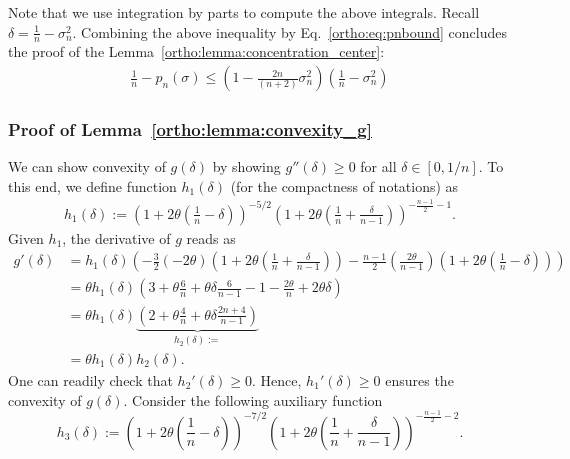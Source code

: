  Note that we use integration by parts to compute the above integrals. 
 Recall $\delta = \frac{1}{n}- \sigma_n^2$.
 Combining the above inequality by Eq.~\eqref{ortho:eq:pnbound} concludes the proof of the Lemma~\ref{ortho:lemma:concentration_center}:
 \begin{align*}
     \frac{1}{n} - p_n(\sigma) \leq \left(1-\frac{2n}{(n+2)}\sigma_n^2\right)\left(\frac{1}{n} - \sigma_n^2\right)
 \end{align*}
 \subsubsection*{Proof of Lemma~\ref{ortho:lemma:convexity_g}}
 We can show convexity of $g(\delta)$ by showing $g''(\delta)\ge 0$ for all $\delta\in [0,1/n]$. To this end, 
 we define function $h_1(\delta)$ (for the compactness of notations) as
 \begin{align*}
 h_1(\delta):=\left(1+2\theta\left(\frac{1}{n}-\delta\right)\right)^{-5/2}\left(1+2\theta\left(\frac{1}{n}+\frac{\delta}{n-1}\right)\right)^{-\frac{n-1}{2}-1}.
 \end{align*}
 Given $h_1$, the derivative of $g$ reads as 
 \begin{align*}
 g'(\delta) &=  h_1(\delta)\left( -\frac{3}{2}(-2\theta)\left(1+2\theta\left(\frac{1}{n}+\frac{\delta}{n-1}\right)\right) - \frac{n-1}{2}\left(\frac{2\theta}{n-1}\right) \left(1+2\theta\left(\frac{1}{n}-\delta\right)\right)\right)\\
 &= \theta h_1(\delta) \left(3 + \theta\frac{6}{n} + \theta\delta\frac{6}{n-1}-1-\frac{2 \theta}{n}+2\theta\delta\right)\\
 &= \theta h_1(\delta) \underbrace{\left(2+\theta \frac{4}{n}+\theta\delta\frac{2n+4}{n-1}\right)}_{h_2(\delta):=}\\
 &= \theta h_1(\delta) h_2(\delta).
 \end{align*}
 One can readily check that $h_2'(\delta) \ge 0$. Hence, $h_1'(\delta)\ge 0$ ensures the convexity of $g(\delta)$. Consider the following auxiliary function
 $$h_3(\delta):=\left(1+2\theta\left(\frac{1}{n}-\delta\right)\right)^{-7/2}\left(1+2\theta\left(\frac{1}{n}+\frac{\delta}{n-1}\right)\right)^{-\frac{n-1}{2}-2}.$$

